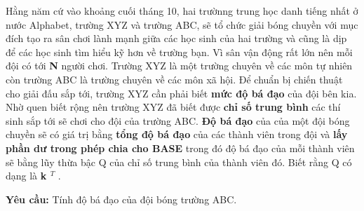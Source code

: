 Hằng năm cứ vào khoảng cuối tháng 10, hai trườnng trung học danh tiếng nhất ở nước Alphabet, trường XYZ và trường ABC, sẽ tổ chức giải bóng chuyền với mục đích tạo ra sân chơi lành mạnh giữa các học sinh của hai trường và cũng là dịp để các học sinh tìm hiểu kỹ hơn về trường bạn. Vì sân vận động rất lớn nên mỗi đội có tới    \textbf{     N    }    người chơi. Trường XYZ là một trường chuyên về các môn tự nhiên còn trường ABC là trường chuyên về các môn xã hội. Để chuẩn bị chiến thuật cho giải đấu sắp tới, trường XYZ cần phải biết    \textbf{     mức độ bá đạo    }    của đội bên kia. Nhờ quen biết rộng nên trường XYZ đã biết được    \textbf{     chỉ số trung bình    }    các thí sinh sắp tới sẽ chơi cho đội của trường ABC.    \textbf{     Độ bá đạo    }    của của một đội bóng chuyền sẽ có giá trị bằng    \textbf{     tổng độ bá đạo    }    của các thành viên trong đội và    \textbf{     lấy phần dư trong phép chia cho BASE    }    trong đó độ bá đạo của mỗi thành viên sẽ bằng lũy thừa bậc Q của chỉ số trung bình của thành viên đó. Biết rằng Q có dạng là    \textbf{     k     $^      T     $}    .   



\textbf{     Yêu cầu:    }    Tính độ bá đạo của đội bóng trường ABC.   



\